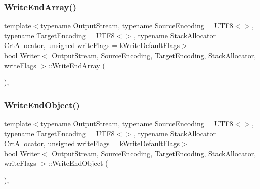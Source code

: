 \mbox{\label{classWriter_aabda2df1be6e83cef416e9b1f042e8f4}} 
\subsubsection{\texorpdfstring{Write\+End\+Array()}{WriteEndArray()}}
{\footnotesize\ttfamily template$<$typename Output\+Stream, typename Source\+Encoding = U\+T\+F8$<$$>$, typename Target\+Encoding = U\+T\+F8$<$$>$, typename Stack\+Allocator = Crt\+Allocator, unsigned write\+Flags = k\+Write\+Default\+Flags$>$ \\
bool \hyperlink{classWriter}{Writer}$<$ Output\+Stream, Source\+Encoding, Target\+Encoding, Stack\+Allocator, write\+Flags $>$\+::Write\+End\+Array (\begin{DoxyParamCaption}{ }\end{DoxyParamCaption})\hspace{0.3cm}{\ttfamily [inline]}, {\ttfamily [protected]}}

\mbox{\label{classWriter_a7e3f6760a50a72f4217a9b2d625c43ee}} 
\subsubsection{\texorpdfstring{Write\+End\+Object()}{WriteEndObject()}}
{\footnotesize\ttfamily template$<$typename Output\+Stream, typename Source\+Encoding = U\+T\+F8$<$$>$, typename Target\+Encoding = U\+T\+F8$<$$>$, typename Stack\+Allocator = Crt\+Allocator, unsigned write\+Flags = k\+Write\+Default\+Flags$>$ \\
bool \hyperlink{classWriter}{Writer}$<$ Output\+Stream, Source\+Encoding, Target\+Encoding, Stack\+Allocator, write\+Flags $>$\+::Write\+End\+Object (\begin{DoxyParamCaption}{ }\end{DoxyParamCaption})\hspace{0.3cm}{\ttfamily [inline]}, {\ttfamily [protected]}}

\mbox{\label{classWriter_a31d0feda654ca245c41462be7dc59998}} 
